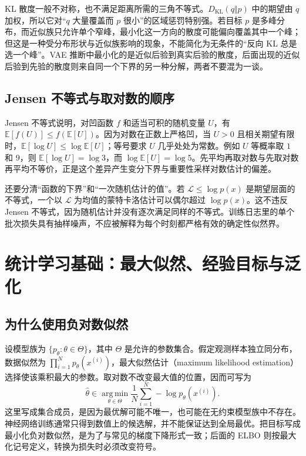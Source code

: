 \documentclass[UTF8,12pt,a4paper,fontset=fandol]{ctexart}
\begin{document}
KL 散度一般不对称，也不满足距离所需的三角不等式。$D_{\mathrm{KL}}(q\Vert p)$ 中的期望由 $q$ 加权，所以它对“$q$ 大量覆盖而 $p$ 很小”的区域惩罚特别强。若目标 $p$ 是多峰分布，而近似族只允许单个窄峰，最小化这一方向的散度可能偏向覆盖其中一个峰；但这是一种受分布形状与近似族影响的现象，不能简化为无条件的“反向 KL 总是选一个峰”。VAE 推断中最小化的是近似后验到真实后验的散度，后面出现的近似后验到先验的散度则来自同一个下界的另一种分解，两者不要混为一谈。

\subsection{Jensen 不等式与取对数的顺序}
Jensen 不等式说明，对凹函数 $f$ 和适当可积的随机变量 $U$，有 $\mathbb E[f(U)]\leq f(\mathbb E[U])$。因为对数在正数上严格凹，当 $U>0$ 且相关期望有限时，$\mathbb E[\log U]\leq\log\mathbb E[U]$；等号要求 $U$ 几乎处处为常数。例如 $U$ 等概率取 $1$ 和 $9$，则 $\mathbb E[\log U]=\log3$，而 $\log\mathbb E[U]=\log5$。先平均再取对数与先取对数再平均不等价，正是这个差异产生变分下界与重要性采样对数估计的偏差。

还要分清“函数的下界”和“一次随机估计的值”。若 $\mathcal L\leq\log p(x)$ 是期望层面的不等式，一个以 $\mathcal L$ 为均值的蒙特卡洛估计可以偶尔超过 $\log p(x)$。这不违反 Jensen 不等式，因为随机估计并没有逐次满足同样的不等式。训练日志里的单个批次损失具有抽样噪声，不应被解释为每个时刻都严格有效的确定性似然界。

\section{统计学习基础：最大似然、经验目标与泛化}
\label{sec:vae-likelihood}

\subsection{为什么使用负对数似然}
设模型族为 $\{p_\theta:\theta\in\Theta\}$，其中 $\Theta$ 是允许的参数集合。假定观测样本独立同分布，数据似然为 $\prod_{i=1}^{N}p_\theta(x^{(i)})$，最大似然估计（maximum likelihood estimation）选择使该乘积最大的参数。取对数不改变最大值的位置，因而可写为
\begin{equation}
 \widehat\theta\in\operatorname*{arg\,min}_{\theta\in\Theta}
 \frac1N\sum_{i=1}^{N}-\log p_\theta(x^{(i)}).
 \label{eq:vae-mle}
\end{equation}
这里写成集合成员，是因为最优解可能不唯一，也可能在无约束模型族中不存在。神经网络训练通常只得到数值上的候选解，并不能保证达到全局最优。把目标写成最小化负对数似然，是为了与常见的梯度下降形式一致；后面的 ELBO 则按最大化记号定义，转换为损失时必须改变符号。
\end{document}
